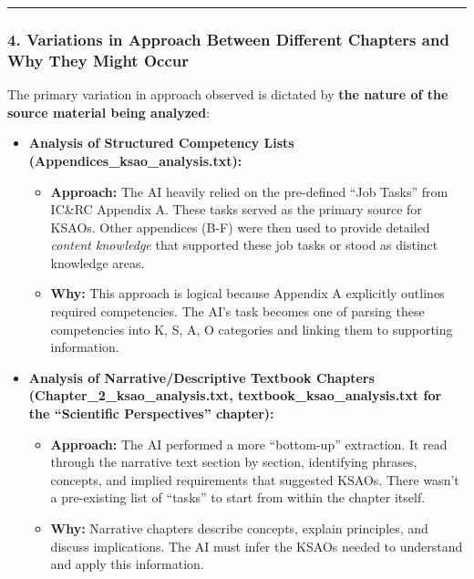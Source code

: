 \documentclass[
  letterpaper,
  DIV=11,
  numbers=noendperiod]{scrartcl}
\providecommand{\tightlist}{%
  \setlength{\itemsep}{0pt}\setlength{\parskip}{0pt}}
\begin{document}
\begin{center}\rule{0.5\linewidth}{0.5pt}\end{center}

\subsubsection{4. Variations in Approach Between Different Chapters and
Why They Might
Occur}\label{variations-in-approach-between-different-chapters-and-why-they-might-occur}

The primary variation in approach observed is dictated by \textbf{the
nature of the source material being analyzed}:

\begin{itemize}
\tightlist
\item
  \textbf{Analysis of Structured Competency Lists
  (Appendices\_ksao\_analysis.txt):}

  \begin{itemize}
  \tightlist
  \item
    \textbf{Approach:} The AI heavily relied on the pre-defined ``Job
    Tasks'' from IC\&RC Appendix A. These tasks served as the primary
    source for KSAOs. Other appendices (B-F) were then used to provide
    detailed \emph{content knowledge} that supported these job tasks or
    stood as distinct knowledge areas.
  \item
    \textbf{Why:} This approach is logical because Appendix A explicitly
    outlines required competencies. The AI's task becomes one of parsing
    these competencies into K, S, A, O categories and linking them to
    supporting information.
  \end{itemize}
\item
  \textbf{Analysis of Narrative/Descriptive Textbook Chapters
  (Chapter\_2\_ksao\_analysis.txt, textbook\_ksao\_analysis.txt for the
  ``Scientific Perspectives'' chapter):}

  \begin{itemize}
  \tightlist
  \item
    \textbf{Approach:} The AI performed a more ``bottom-up'' extraction.
    It read through the narrative text section by section, identifying
    phrases, concepts, and implied requirements that suggested KSAOs.
    There wasn't a pre-existing list of ``tasks'' to start from within
    the chapter itself.
  \item
    \textbf{Why:} Narrative chapters describe concepts, explain
    principles, and discuss implications. The AI must infer the KSAOs
    needed to understand and apply this information.


\end{itemize}
\end{itemize}
\end{document}
